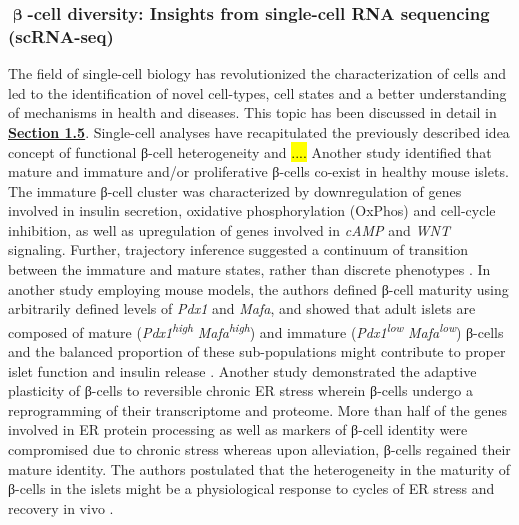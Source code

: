 \subsubsection{\( \mathbf{\upbeta} \)-cell diversity: Insights from single-cell RNA sequencing (scRNA-seq)}
The field of single-cell biology has revolutionized the characterization of cells and led to the identification of novel cell-types, cell states and a better understanding of mechanisms in health and diseases. This topic has been discussed in detail in \textbf{\hyperref[sec:scrna]{Section 1.5}}. Single-cell analyses have recapitulated the previously described idea concept of functional β-cell heterogeneity and \hl{....}  Another study identified that mature and immature and/or proliferative β-cells co-exist in healthy mouse islets. The immature β-cell cluster was characterized by downregulation of genes involved in insulin secretion, oxidative phosphorylation (OxPhos) and cell-cycle inhibition, as well as upregulation of genes involved in \textit{cAMP} and \textit{WNT} signaling. Further, trajectory inference %
suggested a continuum of transition between the immature and mature states, rather than discrete phenotypes \textbf{\cite{sachs_targeted_2020}}. In another study employing mouse models, the authors defined β-cell maturity using arbitrarily defined levels of \textit{Pdx1} and \textit{Mafa}, and showed that adult islets are composed of mature (\textit{Pdx1}\textsuperscript{\textit{high}} \textit{Mafa}\textsuperscript{\textit{high}}) and immature (\textit{Pdx1}\textsuperscript{\textit{low}} \textit{Mafa}\textsuperscript{\textit{low}}) β-cells and the balanced proportion of these sub-populations might contribute to proper islet function and insulin release \textbf{\cite{nasteska_pdx1low_2021}}. Another study demonstrated the adaptive plasticity of β-cells to reversible chronic ER stress wherein β-cells undergo a reprogramming of their transcriptome and proteome. More than half of the genes involved in ER protein processing as well as markers of β-cell identity were compromised due to chronic stress whereas upon alleviation, β-cells regained their mature identity. The authors postulated that the heterogeneity in the maturity of β-cells in the islets might be a physiological response to cycles of ER stress and recovery in vivo \textbf{\cite{chen_adaptation_2022}}.\\\\
